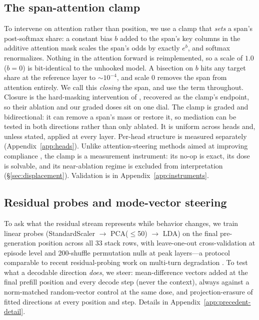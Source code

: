 \documentclass{article}
\begin{document}
\subsection{The span-attention clamp}
\label{sec:clamp}

To intervene on attention rather than position, we use a clamp that \emph{sets} a span's
post-softmax share: a constant bias $b$ added to the span's key columns in the additive attention
mask scales the span's odds by exactly $e^{b}$, and softmax renormalizes. Nothing in the
attention forward is reimplemented, so a scale of $1.0$ ($b{=}0$) is bit-identical to the
unhooked model. A bisection on $b$ hits any target share at the reference layer to
${\sim}10^{-4}$, and scale $0$ removes the span from attention entirely. We call this
\emph{closing} the span, and use the term throughout. Closure is the hard-masking intervention
of \citet{dongre2026attentioncloses}, recovered as the clamp's endpoint, so their ablation and
our graded doses sit on one dial. The clamp is graded and bidirectional: it can remove a span's
mass or restore it, so mediation can be tested in both directions rather than only ablated. It
is uniform across heads and, unless stated, applied at every layer. Per-head structure is
measured separately (Appendix~\ref{app:heads}). Unlike attention-steering methods aimed at
improving compliance \citep{zhang2023pasta}, the clamp is a measurement instrument: its no-op is
exact, its dose is solvable, and its near-ablation regime is excluded from interpretation
(\S\ref{sec:displacement}). Validation is in Appendix~\ref{app:instruments}.

\subsection{Residual probes and mode-vector steering}
\label{sec:probes}

To ask what the residual stream represents while behavior changes, we train linear probes
\citep{alain2016probes,belinkov2022probing} (StandardScaler $\to$ PCA($\leq$50) $\to$ LDA) on
the final pre-generation position across all 33 stack rows, with leave-one-out cross-validation at episode level and 200-shuffle permutation
nulls at peak layers---a protocol comparable to recent residual-probing work on multi-turn
degradation \citep{dongre2026attentioncloses}. To test what a decodable direction \emph{does}, we
steer: mean-difference vectors added at the final prefill position and every decode step (never
the context), always against a norm-matched random-vector control at the same dose, and
projection-erasure of fitted directions at every position and step. Details in
Appendix~\ref{app:precedent-detail}.
\end{document}
